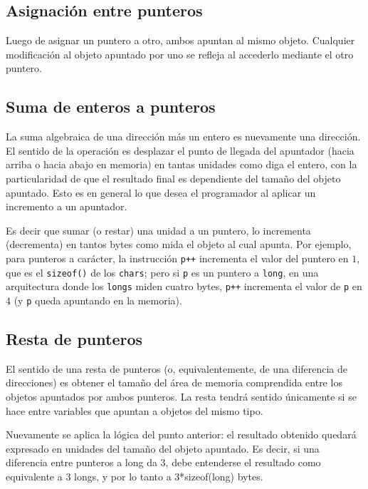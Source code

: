\subsection{Asignación entre punteros}
Luego de asignar un puntero a otro, ambos apuntan al mismo objeto. Cualquier
modificación al objeto apuntado por uno se refleja al accederlo mediante el
otro puntero.

\subsection{Suma de enteros a punteros}
La suma algebraica de una dirección más un entero es nuevamente una dirección.
El sentido de la operación es desplazar el punto de llegada del apuntador
(hacia arriba o hacia abajo en memoria) en tantas unidades como diga el entero,
con la particularidad de que el resultado final es dependiente del tamaño del
objeto apuntado. Esto es en general lo que desea el programador al aplicar un
incremento a un apuntador.

Es decir que sumar (o restar) una unidad a un puntero, lo incrementa
(decrementa) en tantos bytes como mida el objeto al cual apunta.
Por ejemplo, para punteros a carácter, la instrucción \lstinline{p++} incrementa el valor
del puntero en $1$, que es el \lstinline{sizeof()} de los \lstinline{chars}; pero si \lstinline{p} es un puntero a
\lstinline{long}, en una arquitectura donde los \lstinline{longs} miden cuatro bytes, \lstinline{p++} incrementa el
valor de \lstinline{p} en $4$ (y \lstinline{p} queda apuntando  en la memoria). 


\subsection{Resta de punteros}
El sentido de una resta de punteros (o, equivalentemente, de una diferencia de
direcciones) es obtener el tamaño del área de memoria comprendida entre los
objetos apuntados por ambos punteros. La resta tendrá sentido únicamente si se
hace entre variables que apuntan a objetos del mismo tipo.

Nuevamente se aplica la lógica del punto anterior: el resultado obtenido
quedará expresado en unidades del tamaño del objeto apuntado. Es decir, si una
diferencia entre punteros a long da 3, debe entenderse el resultado como
equivalente a 3 longs, y por lo tanto a 3*sizeof(long) bytes.


